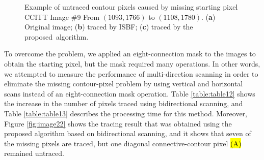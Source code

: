 \documentclass[sensors,article,accept,moreauthors,pdftex,10pt,a4paper]{mdpi}
\begin{document}
\begin{figure}[H]
	\centering
	 
	\caption{Example of untraced contour pixels caused by missing starting pixel CCITT Image \#9 From $(1093, 1766)$ to $(1108, 1780)$. (\textbf{a}) Original image; (\textbf{b}) traced by ISBF; (\textbf{c}) traced by the proposed~algorithm.}
	\label{fig:image21}
\end{figure}

To overcome the problem, we applied an eight-connection mask to the images to obtain the starting pixel, but the mask required many operations. In other words, we attempted to measure the performance of multi-direction scanning in order to eliminate the missing contour-pixel problem by using vertical and horizontal scans instead of an eight-connection mask operation. Table \ref{table:table12} shows the increase in the number of pixels traced using bidirectional scanning, and Table \ref{table:table13} describes the processing time for this method. Moreover, Figure \ref{fig:image22} shows the tracing result that was obtained using the proposed algorithm based on bidirectional scanning, and it shows that seven of the missing pixels are traced, but one diagonal connective-contour pixel \hl{(A)} remained untraced. 
\end{document}
